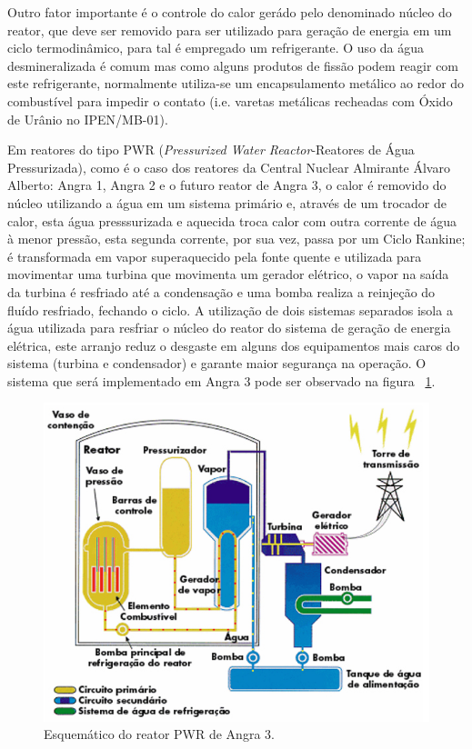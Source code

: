 \documentclass[
	12pt,				%
	openany,			%
	twoside,			%
	a4paper,			%
	english,			%
	french,				%
	spanish,			%
	brazil				%
	]{abntex2}
\begin{document}
Outro fator importante é o controle do calor gerádo pelo denominado núcleo do reator, que deve ser removido para ser utilizado para geração de energia em um ciclo termodinâmico, para tal é empregado um refrigerante. O uso da água desmineralizada é comum mas como alguns produtos de fissão podem reagir com este refrigerante, normalmente utiliza-se um encapsulamento metálico ao redor do combustível para impedir o contato (i.e. varetas metálicas recheadas com Óxido de Urânio no IPEN/MB-01).

Em reatores do tipo PWR (\emph{Pressurized Water Reactor}-Reatores de Água Pressurizada), como é o caso dos reatores da Central Nuclear Almirante Álvaro Alberto: Angra 1, Angra 2 e o futuro reator de Angra 3, o calor é removido do núcleo utilizando a água em um sistema primário e, através de um trocador de calor, esta água presssurizada e aquecida troca calor com outra corrente de água à menor pressão, esta segunda corrente, por sua vez, passa por um Ciclo Rankine\cite{18termodinamica}; é transformada
em vapor superaquecido pela fonte quente e utilizada para movimentar uma turbina que movimenta um gerador elétrico, o vapor na saída da turbina é resfriado até a condensação e uma bomba realiza a reinjeção do fluído resfriado, fechando o ciclo. A utilização de dois sistemas separados isola a água utilizada para resfriar o núcleo do reator do sistema de geração de energia elétrica, este arranjo reduz o desgaste em alguns dos equipamentos mais caros do sistema (turbina e condensador) e garante maior segurança na operação. O sistema que será implementado em Angra 3 pode ser observado na figura ~\ref{PWR}.

\begin{figure}[htpb]
	\caption{\label{PWR} Esquemático do reator PWR de Angra 3.}
	\begin{center}
	    \includegraphics[scale=0.5]{figs/PWRAngra3.jpg}
	\end{center}
\end{figure}
\end{document}
